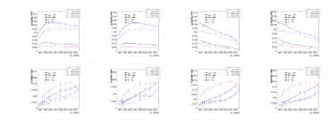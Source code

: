 \begin{figure}[htbp]
  \includegraphics[width=0.2\textwidth]{fig/analysisAppendix/paramSignalYield_VBFSig_mu_HP_vbf_LDy.pdf}
  \includegraphics[width=0.2\textwidth]{fig/analysisAppendix/paramSignalYield_VBFSig_e_HP_vbf_LDy.pdf}
  \includegraphics[width=0.2\textwidth]{fig/analysisAppendix/paramSignalYield_VBFSig_mu_LP_vbf_LDy.pdf}
  \includegraphics[width=0.2\textwidth]{fig/analysisAppendix/paramSignalYield_VBFSig_e_LP_vbf_LDy.pdf}\\
  \includegraphics[width=0.2\textwidth]{fig/analysisAppendix/paramSignalYield_VBFSig_mu_HP_bb_HDy.pdf}
  \includegraphics[width=0.2\textwidth]{fig/analysisAppendix/paramSignalYield_VBFSig_e_HP_bb_HDy.pdf}
  \includegraphics[width=0.2\textwidth]{fig/analysisAppendix/paramSignalYield_VBFSig_mu_LP_bb_HDy.pdf}
  \includegraphics[width=0.2\textwidth]{fig/analysisAppendix/paramSignalYield_VBFSig_e_LP_bb_HDy.pdf}\\

\end{figure}

